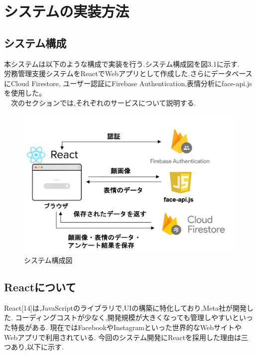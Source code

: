 \chapter{システムの実装方法}
\label{chp:reference}

\section{システム構成}
\label{sec:reference_ftnote}
本システムは以下のような構成で実装を行う.システム構成図を図3.1に示す.\\
労務管理支援システムをReactでWebアプリとして作成した.さらにデータベースにCloud Firestore,
ユーザー認証にFirebase Authentication,表情分析にface-api.jsを使用した。\\
　次のセクションでは,それぞれのサービスについて説明する.

\begin{figure}[!h]
	\begin{center}
			\includegraphics[scale=1.2, clip]{./img/compose.png}
			\caption{システム構成図}
			\label{fig:図の名前}
	\end{center}
\end{figure}


\section{Reactについて}
\label{sec:reference_quote}
React[14]は,JavaScriptのライブラリで,UIの構築に特化しており,Meta社が開発した.
コーディングコストが少なく,開発規模が大きくなっても管理しやすいといった特長がある.
現在ではFacebookやInstagramといった世界的なWebサイトや
Webアプリで利用されている.
今回のシステム開発にReactを採用した理由は三つあり,以下に示す.

